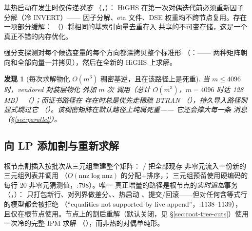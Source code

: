 \documentclass[11pt]{ctexart}
\newtheorem{finding}{发现}
\newcommand{\nnz}{\mathrm{nnz}}
\begin{document}
基热启动在发生时仅传递\emph{状态}
（，）：
HiGHS 在第一次对偶迭代前必须重新因子分解（冷 INVERT）——
因子分解、eta 文件、DSE 权重均不跨节点复用。存在一项部分缓解：
（）将相同的基索引向量去重存入
共享的不可变存储，这是一个真正不错的内存优化。

强分支探测对每个候选变量的每个方向都深拷贝整个标准形
（：——
两种矩阵朝向和全部向量一并拷贝），然后在全新的 HiGHS 上求解。

\begin{finding}[每次求解物化 $O(m^3)$ 稠密基逆，且在该路径上是死重]
当 $m \le 4096$ 时，vendored 封装层物化
 外加 $m$ 次
 调用（总计 $O(m^3)$，$m=4096$ 时达 128\,MB）
（）；而证书路径在
 存在时总是优先走稀疏 BTRAN
（），持久导入路径则显式跳过它
（）。该稠密矩阵在默认路径上纯属死重——
它还会撑大每一条  消息
（\S\ref{sec:parallel}）。
\end{finding}

\subsection{向 LP 添加割与重新求解}
根节点割插入按批次从三元组重建整个矩阵：
 /  把全部现存
非零元流入一份新的三元组列表并调用 
（$O(\nnz \log \nnz)$ 的分配+排序，；
三元组预留使用硬编码的每行 20 非零元猜测值，:798）。唯一
真正增量的路径是根节点的\emph{实时追加}事务
（，）：
只打包新行、对列界做差分、、热启动
、提交/回滚——但对任何含等式行的模型都会被拒绝
（``equalities not supported by live append''，:1138--1139），
且仅在根节点使用。节点上的割后重解（默认关闭，见
\S\ref{sec:root-tree-cuts}）使用一次冷的完整 IPM 求解
（），而非热的对偶单纯形。
\end{document}
